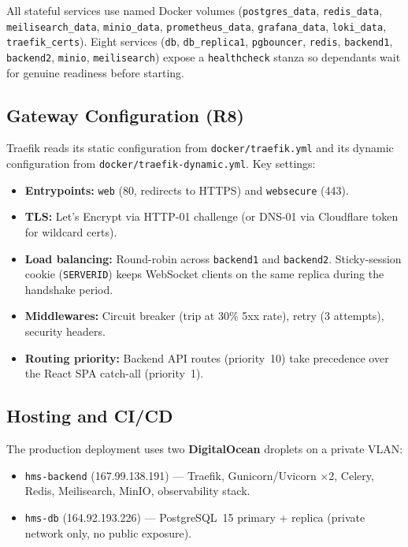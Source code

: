\documentclass[12pt,a4paper]{article}
\begin{document}
All stateful services use named Docker volumes (\texttt{postgres\_data}, \texttt{redis\_data}, \texttt{meilisearch\_data}, \texttt{minio\_data}, \texttt{prometheus\_data}, \texttt{grafana\_data}, \texttt{loki\_data}, \texttt{traefik\_certs}). Eight services (\texttt{db}, \texttt{db\_replica1}, \texttt{pgbouncer}, \texttt{redis}, \texttt{backend1}, \texttt{backend2}, \texttt{minio}, \texttt{meilisearch}) expose a \texttt{healthcheck} stanza so dependants wait for genuine readiness before starting.

\subsection{Gateway Configuration (R8)}

Traefik reads its static configuration from \texttt{docker/traefik.yml} and its dynamic configuration from \texttt{docker/traefik-dynamic.yml}. Key settings:
\begin{itemize}[noitemsep]
  \item \textbf{Entrypoints:} \texttt{web} (80, redirects to HTTPS) and \texttt{websecure} (443).
  \item \textbf{TLS:} Let's Encrypt via HTTP-01 challenge (or DNS-01 via Cloudflare token for wildcard certs).
  \item \textbf{Load balancing:} Round-robin across \texttt{backend1} and \texttt{backend2}. Sticky-session cookie (\texttt{SERVERID}) keeps WebSocket clients on the same replica during the handshake period.
  \item \textbf{Middlewares:} Circuit breaker (trip at 30\% 5xx rate), retry (3 attempts), security headers.
  \item \textbf{Routing priority:} Backend API routes (priority~10) take precedence over the React SPA catch-all (priority~1).
\end{itemize}

\subsection{Hosting and CI/CD}

The production deployment uses two \textbf{DigitalOcean} droplets on a private VLAN:
\begin{itemize}[noitemsep]
  \item \texttt{hms-backend} (167.99.138.191) --- Traefik, Gunicorn/Uvicorn $\times$2, Celery, Redis, Meilisearch, MinIO, observability stack.
  \item \texttt{hms-db} (164.92.193.226) --- PostgreSQL~15 primary + replica (private network only, no public exposure).
\end{itemize}
\end{document}
